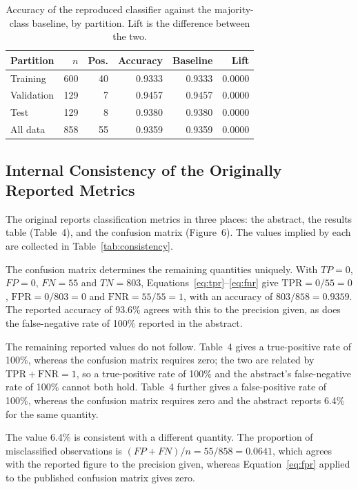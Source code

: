 \begin{table}[t]
\centering
\footnotesize
\caption{Accuracy of the reproduced classifier against the majority-class
baseline, by partition. Lift is the difference between the two.}
\label{tab:baseline}
\renewcommand{\arraystretch}{1.2}
\begin{tabular}{@{}lrrrrr@{}}
\toprule
\textbf{Partition} & \textbf{$n$} & \textbf{Pos.} & \textbf{Accuracy}
& \textbf{Baseline} & \textbf{Lift} \\
\midrule
Training   & 600 & 40 & 0.9333 & 0.9333 & 0.0000 \\
Validation & 129 &  7 & 0.9457 & 0.9457 & 0.0000 \\
Test       & 129 &  8 & 0.9380 & 0.9380 & 0.0000 \\
\midrule
All data   & 858 & 55 & 0.9359 & 0.9359 & 0.0000 \\
\bottomrule
\end{tabular}
\end{table}

\subsection{Internal Consistency of the Originally Reported Metrics}
\label{sec:consistency}

The original reports classification metrics in three places: the abstract, the
results table (Table~4), and the confusion matrix (Figure~6). The values
implied by each are collected in Table~\ref{tab:consistency}.

The confusion matrix determines the remaining quantities uniquely. With
$TP = 0$, $FP = 0$, $FN = 55$ and $TN = 803$,
Equations~\eqref{eq:tpr}--\eqref{eq:fnr} give $\mathrm{TPR} = 0/55 = 0$,
$\mathrm{FPR} = 0/803 = 0$ and $\mathrm{FNR} = 55/55 = 1$, with an accuracy of
$803/858 = 0.9359$. The reported accuracy of 93.6\% agrees with this to the
precision given, as does the false-negative rate of 100\% reported in the
abstract.

The remaining reported values do not follow. Table~4 gives a true-positive rate
of 100\%, whereas the confusion matrix requires zero; the two are related by
$\mathrm{TPR} + \mathrm{FNR} = 1$, so a true-positive rate of 100\% and the
abstract's false-negative rate of 100\% cannot both hold. Table~4 further gives
a false-positive rate of 100\%, whereas the confusion matrix requires zero and
the abstract reports 6.4\% for the same quantity.

The value 6.4\% is consistent with a different quantity. The proportion of
misclassified observations is $(FP + FN)/n = 55/858 = 0.0641$, which agrees
with the reported figure to the precision given, whereas
Equation~\eqref{eq:fpr} applied to the published confusion matrix gives zero.

